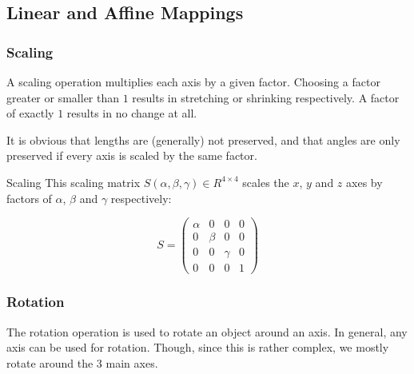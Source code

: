 \documentclass{panikzettel}
\begin{document}
\subsection{Linear and Affine Mappings}
\begin{halfboxl}
\vspace{-\baselineskip}
\subsubsection*{Scaling}

A scaling operation multiplies each axis by a given factor. Choosing a factor greater or smaller than $1$ results in stretching or shrinking respectively. A factor of exactly $1$ results in no change at all.

It is obvious that lengths are (generally) not preserved, and that angles are only preserved if every axis is scaled by the same factor.
\end{halfboxl}%
\begin{halfboxr}
\vspace{-\baselineskip}
\begin{defi}{Scaling}
This scaling matrix $S(\alpha, \beta, \gamma) \in R^{4\times4}$ scales the $x$, $y$ and $z$ axes by factors of $\alpha$, $\beta$ and $\gamma$ respectively:

$$S =\begin{pmatrix} \alpha & 0 & 0 & 0 \\ 0 & \beta & 0 & 0 \\ 0 & 0 & \gamma & 0 \\ 0 & 0 & 0 & 1 \end{pmatrix}$$

\end{defi}
\end{halfboxr}

\subsubsection*{Rotation}

The rotation operation is used to rotate an object around an axis. In general, any axis can be used for rotation. Though, since this is rather complex, we mostly rotate around the 3 main axes.
\end{document}
